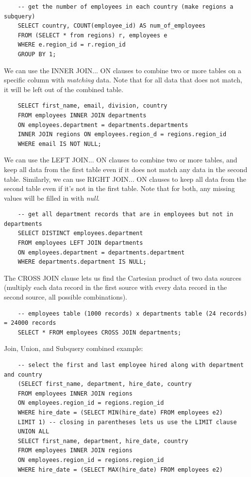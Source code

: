 \documentclass[11pt, a4paper]{article}
\begin{document}
\begin{spacing}{1.1}
\begin{lstlisting}
	-- get the number of employees in each country (make regions a subquery)
	SELECT country, COUNT(employee_id) AS num_of_employees
	FROM (SELECT * from regions) r, employees e
	WHERE e.region_id = r.region_id
	GROUP BY 1; \end{lstlisting} \vspace*{1mm}
	We can use the INNER JOIN... ON clauses to combine two or more tables on a specific column with \textit{matching} data. Note that for all data that does not match, it will be left out of the combined table.
	\begin{lstlisting}
	SELECT first_name, email, division, country
	FROM employees INNER JOIN departments
	ON employees.department = departments.departments
	INNER JOIN regions ON employees.region_d = regions.region_id 
	WHERE email IS NOT NULL; \end{lstlisting} \vspace*{1mm}
	We can use the LEFT JOIN... ON clauses to combine two or more tables, and keep all data from the first table even if it does not match any data in the second table. Similarly, we can use RIGHT JOIN... ON clauses to keep all data from the second table even if it's not in the first table. Note that for both, any missing values will be filled in with \textit{null}.
	
	\begin{lstlisting}
	-- get all department records that are in employees but not in departments
	SELECT DISTINCT employees.department
	FROM employees LEFT JOIN departments
	ON employees.department = departments.department
	WHERE departments.department IS NULL; \end{lstlisting} \vspace*{1mm}
	The CROSS JOIN clause lets us find the Cartesian product of two data sources (multiply each data record in the first source with every data record in the second source, all possible combinations). 
	\begin{lstlisting}
	-- employees table (1000 records) x departments table (24 records) = 24000 records
	SELECT * FROM employees CROSS JOIN departments; \end{lstlisting} \vspace*{1mm}
	Join, Union, and Subquery combined example:
	\begin{lstlisting}
	-- select the first and last employee hired along with department and country
	(SELECT first_name, department, hire_date, country
	FROM employees INNER JOIN regions
	ON employees.region_id = regions.region_id
	WHERE hire_date = (SELECT MIN(hire_date) FROM employees e2)
	LIMIT 1) -- closing in parentheses lets us use the LIMIT clause
	UNION ALL
	SELECT first_name, department, hire_date, country
	FROM employees INNER JOIN regions
	ON employees.region_id = regions.region_id
	WHERE hire_date = (SELECT MAX(hire_date) FROM employees e2)	\end{lstlisting} \vspace*{1mm}

\end{spacing}
\end{document}
